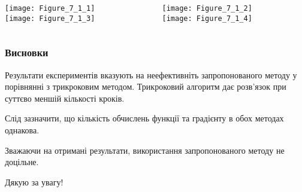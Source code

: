 \begin{frame}
\begin{columns}
	\begin{column}[t]{0.5\linewidth}
		\texttt{[image: Figure\_7\_1\_1]} \\
		\texttt{[image: Figure\_7\_1\_3]}
	\end{column}
	
	\begin{column}[t]{0.5\linewidth}
		\texttt{[image: Figure\_7\_1\_2]} \\
		\texttt{[image: Figure\_7\_1\_4]}
	\end{column}
\end{columns}
\end{frame}

\begin{frame}
\frametitle{Висновки} 
Результати експериментів вказують на неефективніть запропонованого методу у порівнянні з трикроковим методом. Трикроковий алгоритм дає розв'язок при суттєво меншій кількості кроків.

Слід зазначити, що кількість обчислень функції та градієнту в обох методах однакова.

Зважаючи на отримані результати, використання запропонованого методу не доцільне.
\end{frame}

\begin{frame}
\begin{center}
	{\LARGE Дякую за увагу!}
\end{center} 
\end{frame}